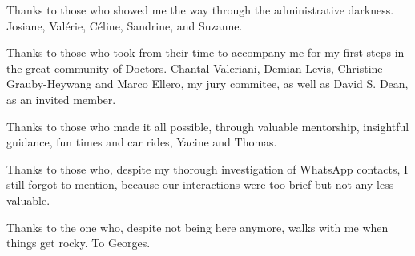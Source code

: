 Thanks to those who showed me the way through the administrative darkness. Josiane, Valérie, Céline, Sandrine, and Suzanne. 

Thanks to those who took from their time to accompany me for my first steps in the great community of Doctors. Chantal Valeriani, Demian Levis, Christine Grauby-Heywang and Marco Ellero, my jury commitee, as well as David S. Dean, as an invited member.

Thanks to those who made it all possible, through valuable mentorship, insightful guidance, fun times and car rides, Yacine and Thomas.

Thanks to those who, despite my thorough investigation of WhatsApp contacts, I still forgot to mention, because our interactions were too brief but not any less valuable.

Thanks to the one who, despite not being here anymore, walks with me when things get rocky. To Georges.